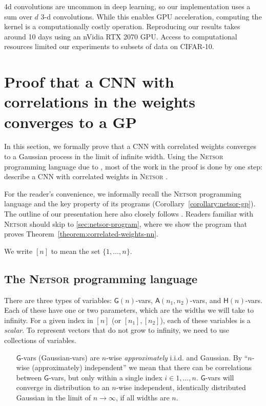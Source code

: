 \documentclass[tablecaption=bottom,wcp,nonatbib]{jmlr} %
\begin{document}
4d convolutions are uncommon in deep learning, so our implementation uses a sum over $d$ 3-d convolutions. While this enables GPU acceleration, computing the kernel is a computationally costly operation. Reproducing our results takes around 10 days using an nVidia RTX 2070 GPU. Access to computational resources limited our experiments to subsets of data on CIFAR-10.


\section{Proof that a CNN with correlations in the weights converges to a GP\label{app:netsor}}
{  %
  \newcommand{\Gva}{\mathsf{G}}
  \newcommand{\Hva}{\mathsf{H}}
  \newcommand{\Ava}{\mathsf{A}}
  \newcommand{\MatMul}{{\texttt{MatMul} }}
  \newcommand{\LinComb}{{\texttt{LinComb} }}
  \newcommand{\Nonlin}{{\texttt{Nonlin} }}
  \newcommand{\Netsor}{{\textsc{Netsor} }}


In this section, we formally prove that a CNN with correlated weights converges
to a Gaussian process in the limit of infinite width. Using the \Netsor
programming language due to \citet{yang2019wide}, most of the work in the proof
is done by
one step: describe a CNN with correlated weights in \Netsor.

For the reader's convenience, we informally recall the \Netsor programming language
\citep{yang2019wide} and the key property of its programs (Corollary~\ref{corollary:netsor-gp}). The outline of our presentation here also closely follows
\citet{yang2019wide}. Readers familiar with \Netsor should skip to
\cref{sec:netsor-program}, where we show the program that proves Theorem~\ref{theorem:correlated-weights-nn}.


We write $[n]$ to mean the set $\{1,\dots,n\}$.

\subsection{The \Netsor programming language}
There are three types of variables: $\Gva(n)$-vars, $\Ava(n_1,
n_2)$-vars, and $\Hva(n)$-vars. Each of these have one or two
parameters, which are the widths we will take to infinity. For a
given index in $[n]$ (or $[n_1],[n_2]$), each of these variables is a \emph{scalar}. To
represent vectors that do not grow to infinity, we need to use collections of variables.

\begin{itemize}
\item[$\Gva$-vars] (Gaussian-vars) are $n$-wise \emph{approximately}
i.i.d. and Gaussian. By ``$n$-wise (approximately) independent'' we mean that there can be
correlations between $\Gva$-vars, but only within a single index $i \in 1,\dots,n$.
$\Gva$-vars will converge in
distribution to an $n$-wise independent, identically distributed Gaussian in the limit of $n \to \infty$, if
all widths are $n$.


\end{itemize}}
\end{document}
